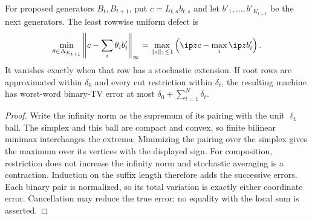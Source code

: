 \begin{proposition}\label{prop:hankel-dual}
For proposed generators $B_t,B_{t+1}$, put $c=L_{t,a}b_{t,s}$ and let
$b'_1,\ldots,b'_{K_{t+1}}$ be the next generators. The least rowwise
uniform defect is
\begin{equation}\label{eq:row-defect}
 \min_{\theta\in\Delta_{K_{t+1}}}\left\|c-\sum_i\theta_i b'_i\right\|_\infty
 =\max_{\|z\|_1\le1}\left(\ip zc-\max_i\ip z{b'_i}\right).
\end{equation}
It vanishes exactly when that row has a stochastic extension. If root
rows are approximated within $\delta_0$ and every cut restriction within
$\delta_t$, the resulting machine has worst-word binary-TV error at
most $\delta_0+\sum_{t=1}^N\delta_t$.
\end{proposition}
\begin{proof}
Write the infinity norm as the supremum of its pairing with the unit
$\ell_1$ ball. The simplex and this ball are compact and convex, so finite
bilinear minimax interchanges the extrema. Minimizing the pairing over
the simplex gives the maximum over its vertices with the displayed sign.
For composition, restriction does not increase the infinity norm and
stochastic averaging is a contraction. Induction on the suffix length
therefore adds the successive errors. Each binary pair is normalized,
so its total variation is exactly either coordinate error. Cancellation
may reduce the true error; no equality with the local sum is asserted.
\end{proof}

